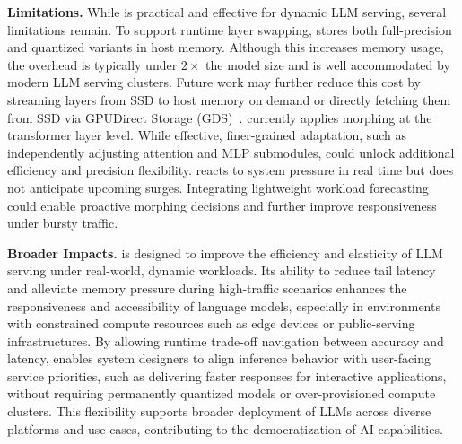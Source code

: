 \noindent\textbf{Limitations.}
While {\system} is practical and effective for dynamic LLM serving, several limitations remain.
To support runtime layer swapping, {\system} stores both full-precision and quantized variants in host memory. Although this increases memory usage, the overhead is typically under $2\times$ the model size and is well accommodated by modern LLM serving clusters. Future work may further reduce this cost by streaming layers from SSD to host memory on demand or directly fetching them from SSD via GPUDirect Storage (GDS)~\cite{nvidia_gds}.
{\system} currently applies morphing at the transformer layer level. While effective, finer-grained adaptation, such as independently adjusting attention and MLP submodules, could unlock additional efficiency and precision flexibility.
{\system} reacts to system pressure in real time but does not anticipate upcoming surges. Integrating lightweight workload forecasting could enable proactive morphing decisions and further improve responsiveness under bursty traffic.

\noindent\textbf{Broader Impacts.}
{\system} is designed to improve the efficiency and elasticity of LLM serving under real-world, dynamic workloads. Its ability to reduce tail latency and alleviate memory pressure during high-traffic scenarios enhances the responsiveness and accessibility of language models, especially in environments with constrained compute resources such as edge devices or public-serving infrastructures. By allowing runtime trade-off navigation between accuracy and latency, {\system} enables system designers to align inference behavior with user-facing service priorities, such as delivering faster responses for interactive applications, without requiring permanently quantized models or over-provisioned compute clusters. This flexibility supports broader deployment of LLMs across diverse platforms and use cases, contributing to the democratization of AI capabilities.
